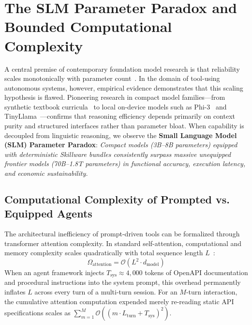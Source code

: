 
\section{The SLM Parameter Paradox and Bounded Computational Complexity}
\label{sec:slm_token_economy}

A central premise of contemporary foundation model research is that reliability scales monotonically with parameter count~\cite{wang2024survey}. In the domain of tool-using autonomous systems, however, empirical evidence demonstrates that this scaling hypothesis is flawed. Pioneering research in compact model families---from synthetic textbook curricula~\cite{gunasekar2023textbooks} to local on-device models such as Phi-3~\cite{abdin2024phi3} and TinyLlama~\cite{zhang2024tinyllama}---confirms that reasoning efficiency depends primarily on context purity and structured interfaces rather than parameter bloat. When capability is decoupled from linguistic reasoning, we observe the \textbf{Small Language Model (SLM) Parameter Paradox}: \emph{Compact models (3B--8B parameters) equipped with deterministic Skillware bundles consistently surpass massive unequipped frontier models (70B--1.8T parameters) in functional accuracy, execution latency, and economic sustainability.}

\subsection{Computational Complexity of Prompted vs. Equipped Agents}
\label{subsec:complexity_analysis}

The architectural inefficiency of prompt-driven tools can be formalized through transformer attention complexity. In standard self-attention, computational and memory complexity scales quadratically with total sequence length $L$~\cite{liu2024lost}:
\begin{equation}
\label{eq:attention_complexity}
\Omega_{\text{attention}} = \mathcal{O}\left( L^2 \cdot d_{\text{model}} \right)
\end{equation}
When an agent framework injects $T_{\text{sys}} \approx 4,000$ tokens of OpenAPI documentation and procedural instructions into the system prompt, this overhead permanently inflates $L$ across every turn of a multi-turn session. For an $M$-turn interaction, the cumulative attention computation expended merely re-reading static API specifications scales as $\sum_{m=1}^M \mathcal{O}((m \cdot L_{\text{turn}} + T_{\text{sys}})^2)$.

